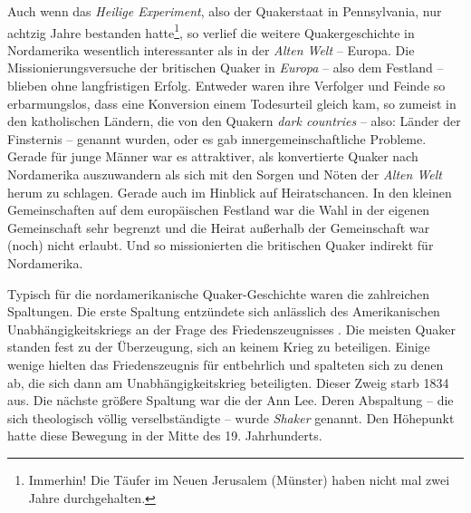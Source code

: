 \medskip

Auch wenn das \textit{Heilige Experiment}, also der Quakerstaat in Pennsylvania,
nur achtzig Jahre
bestanden hatte\footnote{Immerhin! Die Täufer im Neuen Jerusalem (Münster)
 haben
nicht mal zwei Jahre durchgehalten.}, so verlief die weitere
Quakergeschichte in Nordamerika wesentlich interessanter als in der
\textit{Alten
Welt} -- Europa. Die Missionierungsversuche der britischen
Quaker in
\textit{Europa} -- also dem Festland -- blieben ohne
langfristigen Erfolg.
Entweder waren ihre Verfolger und Feinde so erbarmungslos,
dass eine
Konversion einem Todesurteil gleich kam, so zumeist in den katholischen
Ländern, die von den Quakern \textit{dark countries} -- also: Länder der
Finsternis -- genannt wurden, oder es gab innergemeinschaftliche Probleme.
Gerade
für junge Männer war es attraktiver, als konvertierte Quaker nach Nordamerika
auszuwandern als sich mit den Sorgen und Nöten der \textit{Alten Welt} herum
zu
schlagen. Gerade auch im Hinblick auf Heiratschancen. In den
kleinen
Gemeinschaften auf dem europäischen Festland war die Wahl in der eigenen
Gemeinschaft sehr begrenzt und die Heirat außerhalb der Gemeinschaft war (noch)
nicht erlaubt. Und so missionierten die britischen Quaker indirekt für
Nordamerika.

\medskip

Typisch für die nordamerikanische Quaker-Geschichte waren die zahlreichen
Spaltungen. Die erste Spaltung entzündete sich anlässlich des
Amerikanischen
Unabhängigkeitskriegs an der Frage des Friedenszeugnisses
. Die meisten Quaker
standen fest zu der Überzeugung, sich an keinem Krieg zu
beteiligen. Einige
wenige hielten das Friedenszeugnis für entbehrlich und spalteten sich zu denen
 ab,
die sich dann am Unabhängigkeitskrieg
beteiligten. Dieser Zweig starb 1834 aus. Die nächste größere Spaltung war die
der Ann Lee. Deren Abspaltung -- die sich theologisch
völlig verselbständigte --
wurde \textit{Shaker} genannt. Den Höhepunkt hatte
diese Bewegung in der Mitte
des 19. Jahrhunderts.

\medskip


